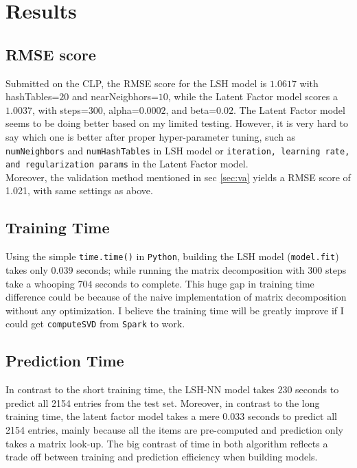 \documentclass{scrartcl}
\begin{document}
\section{Results}
\subsection{RMSE score}
Submitted on the CLP, the RMSE score for the LSH model is $1.0617$ with hashTables=$20$ and nearNeigbhors=$10$, while the Latent Factor model scores a $1.0037$, with steps=$300$, alpha=$0.0002$, and beta=$0.02$. The Latent Factor model seems to be doing better based on my limited testing. However, it is very hard to say which one is better after proper hyper-parameter tuning, such as \texttt{numNeighbors} and \texttt{numHashTables} in LSH model or \texttt{iteration, learning rate, and regularization params} in the Latent Factor model. \\
Moreover, the validation method mentioned in sec \ref{sec:va} yields a RMSE score of 1.021, with same settings as above.
\subsection{Training Time}
Using the simple \texttt{time.time()} in \texttt{Python}, building the LSH model (\texttt{model.fit}) takes only $0.039$ seconds; while running the matrix decomposition with 300 steps take a whooping $704$ seconds to complete. This huge gap in training time difference could be because of the naive implementation of matrix decomposition without any optimization. I believe the training time will be greatly improve if I could get \texttt{computeSVD} from \texttt{Spark} to work.
\subsection{Prediction Time}
In contrast to the short training time, the LSH-NN model takes $230$ seconds to predict all 2154 entries from the test set. Moreover, in contrast to the long training time, the latent factor model takes a mere $0.033$ seconds to predict all 2154 entries, mainly because all the items are pre-computed and prediction only takes a matrix look-up. The big contrast of time in both algorithm reflects a trade off between training and prediction efficiency when building models.
\end{document}
